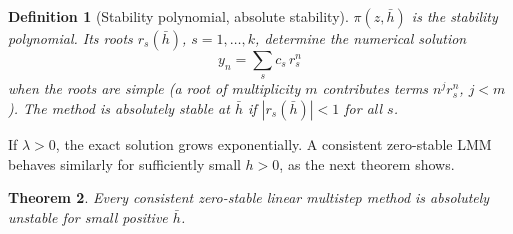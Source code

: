 \documentclass[11pt,a4paper]{article}
\numberwithin{equation}{section}
\theoremstyle{spacedplain}
\newtheorem{theorem}{Theorem}[section]
\theoremstyle{spaceddefinition}
\newtheorem{definition}[theorem]{Definition}
\theoremstyle{spacedremark}
\newcommand{\hb}{\bar h}
\begin{document}
\begin{definition}[Stability polynomial, absolute stability]
\(\pi(z,\hb)\) is the \emph{stability polynomial}.  Its roots
\(r_s(\hb)\), \(s=1,\dots,k\), determine the numerical solution
\[
  y_n=\sum_s c_s\,r_s^n
\]
when the roots are simple (a root of multiplicity \(m\) contributes
terms \(n^jr_s^n\), \(j<m\)).  The method is \emph{absolutely stable}
at \(\hb\) if
\(|r_s(\hb)|<1\) for all \(s\).
\end{definition}

If \(\lambda>0\), the exact solution grows exponentially.  A consistent
zero-stable LMM behaves similarly for sufficiently small \(h>0\), as the
next theorem shows.

\begin{keybox}
\begin{theorem}\label{thm:absunst}
Every consistent zero-stable linear multistep method is absolutely
unstable for small positive \(\hb\).
\end{theorem}
\end{keybox}
\end{document}

